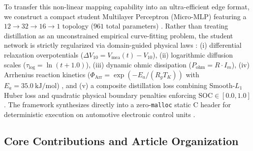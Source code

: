 To transfer this non-linear mapping capability into an ultra-efficient edge format, we construct a compact student Multilayer Perceptron (Micro-MLP) featuring a $12 \to 32 \to 16 \to 1$ topology ($961$ total parameters) \cite{lin2020mcunet}. Rather than treating distillation as an unconstrained empirical curve-fitting problem, the student network is strictly regularized via domain-guided physical laws \cite{karniadakis2021physics, sorouri2026physics}: (i) differential relaxation overpotentials ($\Delta V_{10} = V_{\text{mea}}(t) - V_{10}$), (ii) logarithmic diffusion scales ($\tau_{\text{log}} = \ln(t + 1.0)$), (iii) dynamic ohmic dissipation ($P_{\text{ohm}} = R \cdot I_m$), (iv) Arrhenius reaction kinetics ($\Phi_{\text{Arr}} = \exp(-E_a/(R_g T_K))$ with $E_a = 35.0\ \text{kJ/mol}$) \cite{rahimirad2019battery, meng2025domain}, and (v) a composite distillation loss combining Smooth-$L_1$ Huber loss and quadratic physical boundary penalties enforcing $\text{SOC} \in [0.0, 1.0]$. The framework synthesizes directly into a zero-\texttt{malloc} static C header for deterministic execution on automotive electronic control units \cite{yahyaei2023embedded}.

\subsection{Core Contributions and Article Organization}
\label{sec:intro_d}

